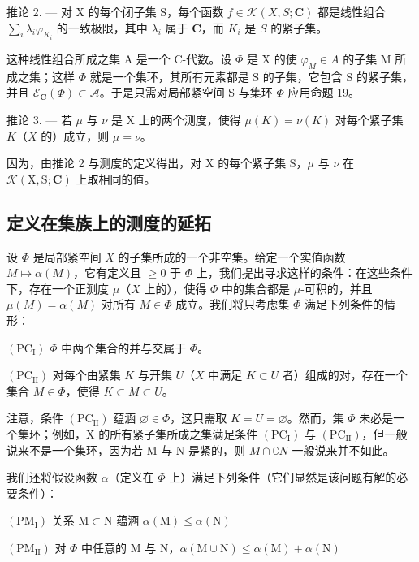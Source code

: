 推论 2. --- 对 X 的每个闭子集 S，每个函数 \(f \in \mathcal{K}(X, S; \mathbf{C})\) 都是线性组合 \(\sum_{i} \lambda_i \varphi_{K_i}\) 的一致极限，其中 \(\lambda_i\) 属于 \(\mathbf{C}\)，而 \(K_i\) 是 \(S\) 的紧子集。

这种线性组合所成之集 A 是一个 C-代数。设 \(\Phi\) 是 X 的使 \(\varphi_{M} \in A\) 的子集 M 所成之集；这样 \(\Phi\) 就是一个集环，其所有元素都是 S 的子集，它包含 S 的紧子集，并且 \(\mathcal{E}_{\mathbf{C}}(\Phi) \subset \mathcal{A}\)。于是只需对局部紧空间 S 与集环 \(\Phi\) 应用命题 19。

推论 3. --- 若 \(\mu\) 与 \(\nu\) 是 X 上的两个测度，使得 \(\mu(K) = \nu(K)\) 对每个紧子集 \(K\)（\(X\) 的）成立，则 \(\mu = \nu\)。

因为，由推论 2 与测度的定义得出，对 X 的每个紧子集 S，\(\mu\) 与 \(\nu\) 在 \(\mathcal{K}(\mathrm{X},\mathrm{S};\mathbf{C})\) 上取相同的值。

\subsection{定义在集族上的测度的延拓}

设 \(\Phi\) 是局部紧空间 \(X\) 的子集所成的一个非空集。给定一个实值函数 \(M \mapsto \alpha(M)\)，它有定义且 \(\geqslant 0\) 于 \(\Phi\) 上，我们提出寻求这样的条件：在这些条件下，存在一个正测度 \(\mu\)（\(X\) 上的），使得 \(\Phi\) 中的集合都是 \(\mu\)-可积的，并且 \(\mu(M) = \alpha(M)\) 对所有 \(M \in \Phi\) 成立。我们将只考虑集 \(\Phi\) 满足下列条件的情形：

\((\mathrm{PC}_{\mathrm{I}})\) \(\Phi\) 中两个集合的并与交属于 \(\Phi\)。

\((\mathrm{PC}_{\mathrm{II}})\) 对每个由紧集 \(K\) 与开集 \(U\)（\(X\) 中满足 \(K \subset U\) 者）组成的对，存在一个集合 \(M \in \Phi\)，使得 \(K \subset M \subset U\)。

注意，条件 \((\mathrm{PC}_{\mathrm{II}})\) 蕴涵 \(\varnothing\in\Phi\)，这只需取 \(K=U=\varnothing\)。然而，集 \(\Phi\) 未必是一个集环；例如，X 的所有紧子集所成之集满足条件 \((\mathrm{PC}_{\mathrm{I}})\) 与 \((\mathrm{PC}_{\mathrm{II}})\)，但一般说来不是一个集环，因为若 M 与 N 是紧的，则 \(M\cap \complement N\) 一般说来并不如此。

我们还将假设函数 \(\alpha\)（定义在 \(\Phi\) 上）满足下列条件（它们显然是该问题有解的必要条件）：

\((\mathrm{PM}_{\mathrm{I}})\) 关系 \(\mathrm{M}\subset \mathrm{N}\) 蕴涵 \(\alpha (\mathrm{M})\leqslant \alpha (\mathrm{N})\)

\((\mathrm{PM}_{\mathrm{II}})\) 对 \(\Phi\) 中任意的 M 与 N，\(\alpha (\mathrm{M}\cup \mathrm{N})\leqslant \alpha (\mathrm{M}) + \alpha (\mathrm{N})\)

